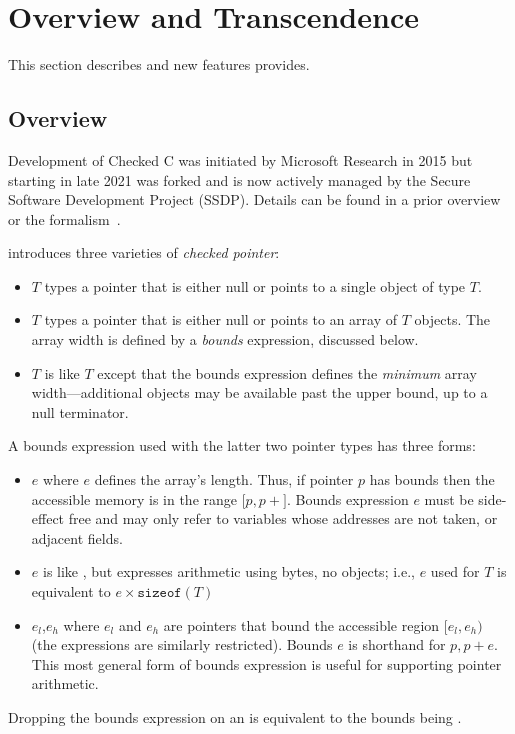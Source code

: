 \section{Overview and Transcendence}\label{sec:overview}

This section describes \checkedc and new features \systemname provides.


\subsection{\checkedc Overview}

Development of Checked C was initiated by Microsoft Research in 2015 but starting in
late 2021 was forked and is now actively managed by the Secure Software
Development Project (SSDP). Details can be found in a prior
overview~\cite{Elliott2018} or the formalism~\cite{li22checkedc}.

\checkedc introduces three varieties of \emph{checked pointer}:
\begin{itemize}
\item {}$T$\code{>} types a pointer that is either null or
  points to a single object of type $T$.
\item {}$T$\code{>} types a pointer that is either null
  or points to an array of $T$ objects. The array width is defined
  by a \emph{bounds} expression, discussed below.
\item {}$T$\code{>} is like
  $T$\code{>} except that the bounds expression
  defines the \emph{minimum} array width---additional objects may
  be available past the upper bound, up to a null terminator.
\end{itemize}
A bounds expression used with the latter two pointer types has three
forms:
\begin{itemize}
\item {}$e$\code{)} where $e$ defines the array's
  length. Thus, if pointer $p$ has bounds  then the
  accessible memory is in the range $[p,p+$$]$. Bounds
  expression $e$ must be side-effect free and may only refer to
  variables whose addresses are not taken, or adjacent 
  fields.
\item {}$e$\code{)} is like , but
  expresses arithmetic using bytes, no objects; i.e.,
  $e$\code{)} used for $T$\code{>} is
  equivalent to $e\times\texttt{sizeof}(T)$\code{)}
\item {}$e_l$,$e_h$\code{)} where $e_l$ and $e_h$ are
  pointers that bound the accessible region $[e_l,e_h)$ (the
  expressions are similarly restricted). Bounds
  $e$\code{)} is shorthand for
  $p, p + e$\code{)}. This most general form of bounds
  expression is useful for supporting pointer arithmetic.
\end{itemize}
  Dropping the bounds expression on an  is equivalent
  to the bounds being .

